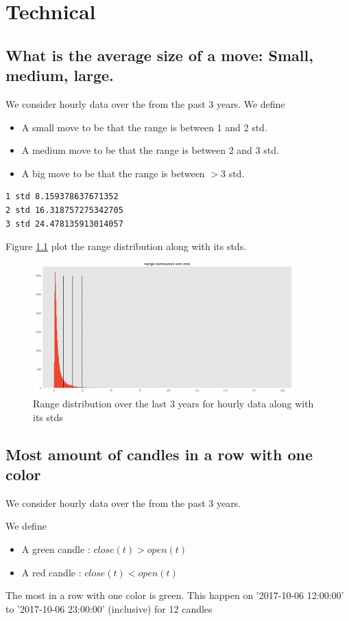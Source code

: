 \chapter{Technical}
\label{tech}

\section{ What is the average size of a move: Small, medium, large.}
We consider hourly data over the from the past 3 years.
We define 
\begin{itemize}
\item A small move to be that the range is between 1 and 2 std.
\item A medium move to be that the range is between 2 and 3 std.
\item A big move to be that the range is between $>3$ std.
\end{itemize}
\begin{verbatim}
1 std 8.159378637671352
2 std 16.318757275342705
3 std 24.478135913014057
\end{verbatim}

Figure \ref{fig:move} plot the range distribution along with its stds.

\begin{figure}[H]
\center
\includegraphics[width=0.9\textwidth]{fig/move.png}
\caption{Range distribution over the last 3 years for hourly data along with its stds}
\label{fig:move}
\end{figure}
\section{ Most amount of candles in a row with one color}
We consider hourly data over the from the past 3 years.

We define
\begin{itemize}
\item A green candle  :  $close(t) > open(t)$
\item A red candle  :  $close(t) < open(t)$
\end{itemize}
The most in a row with one color is green. This happen on '2017-10-06 12:00:00' to '2017-10-06 23:00:00' (inclusive) for 12 candles

